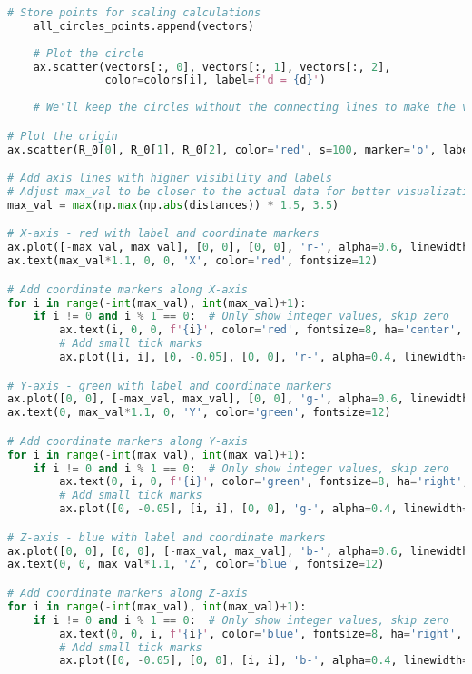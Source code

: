 \begin{lstlisting}[language=Python]
    # Store points for scaling calculations
    all_circles_points.append(vectors)
    
    # Plot the circle
    ax.scatter(vectors[:, 0], vectors[:, 1], vectors[:, 2], 
               color=colors[i], label=f'd = {d}')
    
    # We'll keep the circles without the connecting lines to make the visualization cleaner

# Plot the origin
ax.scatter(R_0[0], R_0[1], R_0[2], color='red', s=100, marker='o', label='Origin R_0')

# Add axis lines with higher visibility and labels
# Adjust max_val to be closer to the actual data for better visualization
max_val = max(np.max(np.abs(distances)) * 1.5, 3.5)

# X-axis - red with label and coordinate markers
ax.plot([-max_val, max_val], [0, 0], [0, 0], 'r-', alpha=0.6, linewidth=1.0)
ax.text(max_val*1.1, 0, 0, 'X', color='red', fontsize=12)

# Add coordinate markers along X-axis
for i in range(-int(max_val), int(max_val)+1):
    if i != 0 and i % 1 == 0:  # Only show integer values, skip zero
        ax.text(i, 0, 0, f'{i}', color='red', fontsize=8, ha='center', va='bottom')
        # Add small tick marks
        ax.plot([i, i], [0, -0.05], [0, 0], 'r-', alpha=0.4, linewidth=0.5)

# Y-axis - green with label and coordinate markers
ax.plot([0, 0], [-max_val, max_val], [0, 0], 'g-', alpha=0.6, linewidth=1.0)
ax.text(0, max_val*1.1, 0, 'Y', color='green', fontsize=12)

# Add coordinate markers along Y-axis
for i in range(-int(max_val), int(max_val)+1):
    if i != 0 and i % 1 == 0:  # Only show integer values, skip zero
        ax.text(0, i, 0, f'{i}', color='green', fontsize=8, ha='right', va='center')
        # Add small tick marks
        ax.plot([0, -0.05], [i, i], [0, 0], 'g-', alpha=0.4, linewidth=0.5)

# Z-axis - blue with label and coordinate markers
ax.plot([0, 0], [0, 0], [-max_val, max_val], 'b-', alpha=0.6, linewidth=1.0)
ax.text(0, 0, max_val*1.1, 'Z', color='blue', fontsize=12)

# Add coordinate markers along Z-axis
for i in range(-int(max_val), int(max_val)+1):
    if i != 0 and i % 1 == 0:  # Only show integer values, skip zero
        ax.text(0, 0, i, f'{i}', color='blue', fontsize=8, ha='right', va='center')
        # Add small tick marks
        ax.plot([0, -0.05], [0, 0], [i, i], 'b-', alpha=0.4, linewidth=0.5)


\end{lstlisting}

